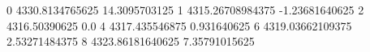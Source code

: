 0 4330.8134765625 14.3095703125
1 4315.26708984375 -1.23681640625
2 4316.50390625 0.0
4 4317.435546875 0.931640625
6 4319.03662109375 2.53271484375
8 4323.86181640625 7.35791015625
